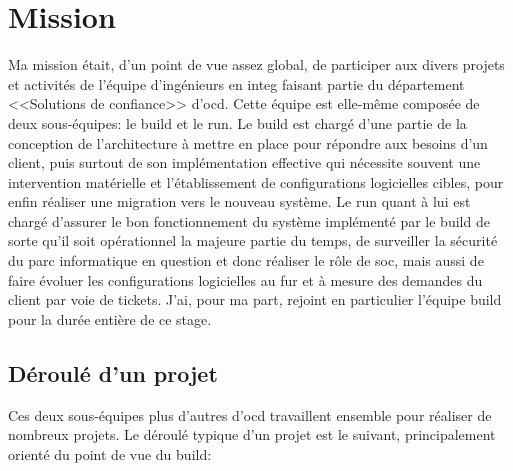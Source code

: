 \documentclass[12pt, oneside, a4paper, titlepage]{report}
\begin{document}
\chapter{Mission}%
\label{cha:mission}

Ma mission était, d'un point de vue assez global, de participer aux divers
projets et activités de l'équipe d'ingénieurs en \gls{integ} faisant partie du
département <<Solutions de confiance>> d'\acrlong{ocd}. Cette équipe est
elle-même composée de deux sous-équipes: le \gls{build} et le \gls{run}.  Le
\gls{build} est chargé d'une partie de la conception de l'architecture à mettre
en place pour répondre aux besoins d'un client, puis surtout de son
implémentation effective qui nécessite souvent une intervention matérielle et
l'établissement de configurations logicielles cibles, pour enfin réaliser une
migration vers le nouveau système. Le \gls{run} quant à lui est chargé d'assurer
le bon fonctionnement du système implémenté par le \gls{build} de sorte qu'il
soit opérationnel la majeure partie du temps, de surveiller la sécurité du parc
informatique en question et donc réaliser le rôle de \gls{soc}, mais aussi de
faire évoluer les configurations logicielles au fur et à mesure des demandes du
client par voie de tickets. J'ai, pour ma part, rejoint en particulier l'équipe
\gls{build} pour la durée entière de ce stage.


\section{Déroulé d'un projet}%
\label{sec:mission::deroule-projet}

Ces deux sous-équipes plus d'autres d'\gls{ocd} travaillent ensemble pour
réaliser de nombreux projets. Le déroulé typique d'un projet est le suivant,
principalement orienté du point de vue du \gls{build}:
\end{document}
